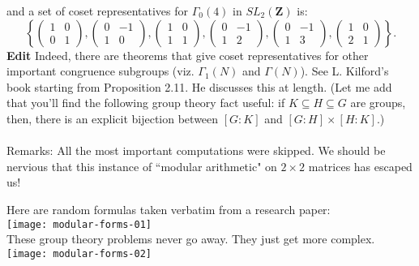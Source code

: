 \documentclass[12pt]{article}
\begin{document}
and a set of coset representatives for $\Gamma_0(4)$ in $SL_2(\mathbf{Z})$ is: 
$$\left\{ \begin{pmatrix}1 &0 \\ 0 & 1 \end{pmatrix}, \begin{pmatrix} 0 & -1 \\ 1& 0\end{pmatrix}, \begin{pmatrix} 1 & 0 \\ 1 & 1\end{pmatrix}, \begin{pmatrix} 0 & -1 \\ 1 & 2\end{pmatrix}, \begin{pmatrix} 0 & -1 \\ 1 & 3\end{pmatrix}, \begin{pmatrix}1 & 0 \\ 2 & 1 \end{pmatrix}\right\}.$$
\textbf{Edit} Indeed, there are theorems that give coset representatives for other important congruence subgroups (viz. $\Gamma_1(N)$ and $\Gamma(N)$). See L. Kilford's book starting from Proposition 2.11. He discusses this at length. (Let me add that you'll find the following group theory fact useful: if $K \subseteq H \subseteq G$ are groups, then, there is an explicit bijection between $[G: K]$ and $[G: H] \times [H: K]$.) \\ \\
{\color{orange}Remarks}: All the most important computations were skipped.  We should be nervious that this instance of ``modular arithmetic" on $2 \times 2$ matrices has escaped us! 

\newpage

\noindent Here are random formulas taken verbatim from a research paper: \\
\texttt{[image: modular-forms-01]} \\
These group theory problems never go away.  They just get more complex. \\
\texttt{[image: modular-forms-02]} \\
\end{document}
